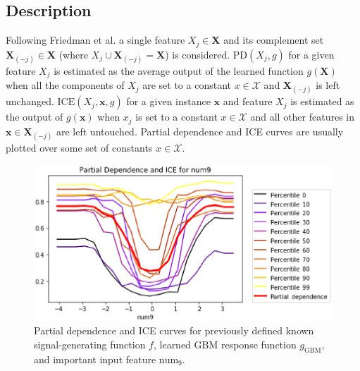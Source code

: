 \documentclass[11pt]{asaproc}
\begin{document}
\subsection{Description}
	
Following Friedman et al. a single feature $X_j \in \mathbf{X}$ and its complement set $\mathbf{X}_{(-j)} \in \mathbf{X}$ (where $X_j \cup \mathbf{X}_{(-j)} = \mathbf{X}$) is considered. $\text{PD}(X_j, g)$ for a given feature $X_j$ is estimated as the average output of the learned function $g(\mathbf{X})$ when all the components of $X_j$ are set to a constant $x \in \mathcal{X}$ and $\mathbf{X}_{(-j)}$ is left unchanged. $\text{ICE}(X_j, \mathbf{x}, g)$ for a given instance $\mathbf{x}$ and feature $X_j$ is estimated as the output of $g(\mathbf{x})$ when $x_j$ is set to a constant $x \in \mathcal{X}$ and all other features in $\mathbf{x} \in \mathbf{X}_{(-j)}$ are left untouched. Partial dependence and ICE curves are usually plotted over some set of constants $x \in \mathcal{X}$. 

\begin{figure}[htb]
	\begin{center}
		\includegraphics[scale=0.5]{img/figure_4.eps}
		\caption{Partial dependence and ICE curves for previously defined known signal-generating function $f$,  learned GBM response function $g_{\text{GBM}}$, and important input feature $\text{num}_9$.}
		\label{fig:pdp_ice}
	\end{center}
\end{figure}
\end{document}
